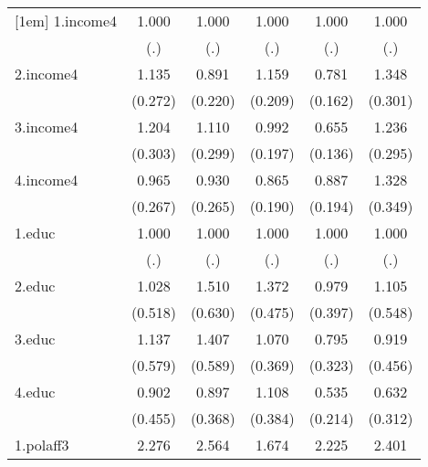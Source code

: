\begin{table}[htbp]
\begin{tabular}{l*{5}{c}}
[1em]
1.income4       &    1.000         &    1.000         &    1.000         &    1.000         &    1.000         \\
                &      (.)         &      (.)         &      (.)         &      (.)         &      (.)         \\
[1em]
2.income4       &    1.135         &    0.891         &    1.159         &    0.781         &    1.348         \\
                &  (0.272)         &  (0.220)         &  (0.209)         &  (0.162)         &  (0.301)         \\
[1em]
3.income4       &    1.204         &    1.110         &    0.992         &    0.655\sym{**} &    1.236         \\
                &  (0.303)         &  (0.299)         &  (0.197)         &  (0.136)         &  (0.295)         \\
[1em]
4.income4       &    0.965         &    0.930         &    0.865         &    0.887         &    1.328         \\
                &  (0.267)         &  (0.265)         &  (0.190)         &  (0.194)         &  (0.349)         \\
[1em]
1.educ          &    1.000         &    1.000         &    1.000         &    1.000         &    1.000         \\
                &      (.)         &      (.)         &      (.)         &      (.)         &      (.)         \\
[1em]
2.educ          &    1.028         &    1.510         &    1.372         &    0.979         &    1.105         \\
                &  (0.518)         &  (0.630)         &  (0.475)         &  (0.397)         &  (0.548)         \\
[1em]
3.educ          &    1.137         &    1.407         &    1.070         &    0.795         &    0.919         \\
                &  (0.579)         &  (0.589)         &  (0.369)         &  (0.323)         &  (0.456)         \\
[1em]
4.educ          &    0.902         &    0.897         &    1.108         &    0.535         &    0.632         \\
                &  (0.455)         &  (0.368)         &  (0.384)         &  (0.214)         &  (0.312)         \\
[1em]
1.polaff3       &    2.276\sym{***}&    2.564\sym{***}&    1.674\sym{***}&    2.225\sym{***}&    2.401\sym{***}\\

\end{tabular}
\end{table}
